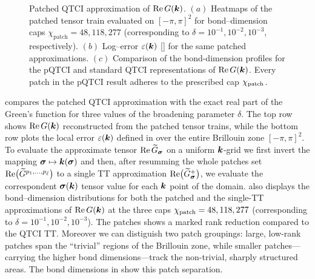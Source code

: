 \begin{figure}[htbp]
    \caption{Patched QTCI approximation of
           \(\operatorname{Re}G(\boldsymbol{k})\).
           $(a)$ Heatmaps of the patched tensor train evaluated on \([-\pi,\pi]^{2}\) for bond–dimension caps \(\chi_{\text{patch}}=48,118,277\) (corresponding to
           \(\delta=10^{-1},10^{-2},10^{-3}\), respectively).
           $(b)$ Log–error \(\varepsilon(\boldsymbol{k})\) []
           for the same patched approximations. 
           $(c)$ Comparison of the bond-dimension profiles for the pQTCI and standard QTCI representations of \(\operatorname{Re}G(\boldsymbol{k})\). Every patch in the pQTCI result adheres to the prescribed cap $\chi_{\text{patch}}$.}
    \label{fig:2DGreenErrorHeatmap}
\end{figure}

 compares the patched QTCI approximation with the exact real part of the Green’s function for three values of the
broadening parameter \(\delta\).  The top row shows
\(\operatorname{Re}G(\boldsymbol{k})\) reconstructed from the patched tensor trains, while the bottom row plots the local error \(\varepsilon(\boldsymbol{k})\) defined in  over the entire Brillouin zone \([-\pi,\pi]^{2}\). To evaluate the approximate tensor
\(\operatorname{Re}\widetilde{G}_{\boldsymbol{\sigma}}\) on a uniform \(\boldsymbol{k}\)-grid we first invert the mapping \(\boldsymbol{\sigma}\mapsto\boldsymbol{k}(\boldsymbol{\sigma})\) and then, after resumming the whole patches set $\text{Re}\bigl(\widetilde{G}^{p_1,\dots,p_{{\bar \ell}}}\bigr)$ to a single TT approximation $\text{Re}\bigl(\widetilde{G}_{\boldsymbol{\sigma}}^{+}\bigr)$, we evaluate the correspondent $\boldsymbol{\sigma}(\boldsymbol{k})$ tensor value for each $\boldsymbol{k}$ point of the domain.   also displays the bond–dimension distributions for both the patched and the single-TT approximations of \(\operatorname{Re}G(\boldsymbol{k})\)  at the three caps $\chi_{\text{patch}}=48,118,277$ (corresponding to  $\delta=10^{-1},10^{-2},10^{-3}$). The patches shows a marked rank reduction compared to the QTCI TT. Moreover we can distiguish two patch groupings: large, low-rank patches span the ``trivial'' regions of the Brillouin zone, while smaller patches—carrying the higher bond dimensions—track the non-trivial, sharply structured areas. The bond dimensions in show this patch separation.


